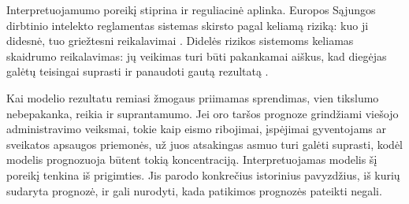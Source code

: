 \documentclass[]{VUMIFTemplateClass}
\begin{document}
    Interpretuojamumo poreikį stiprina ir reguliacinė aplinka.
    Europos Sąjungos dirbtinio intelekto reglamentas sistemas skirsto pagal keliamą riziką: kuo ji didesnė, tuo griežtesni reikalavimai \cite{reglamentas2024}.
    Didelės rizikos sistemoms keliamas skaidrumo reikalavimas: jų veikimas turi būti pakankamai aiškus, kad diegėjas galėtų teisingai suprasti ir panaudoti gautą rezultatą \cite{reglamentas2024}.

    Kai modelio rezultatu remiasi žmogaus priimamas sprendimas, vien tikslumo nebepakanka, reikia ir suprantamumo.
    Jei oro taršos prognoze grindžiami viešojo administravimo veiksmai, tokie kaip eismo ribojimai, įspėjimai gyventojams ar sveikatos apsaugos priemonės, už juos atsakingas asmuo turi galėti suprasti, kodėl modelis prognozuoja būtent tokią koncentraciją.
    Interpretuojamas modelis šį poreikį tenkina iš prigimties.
    Jis parodo konkrečius istorinius pavyzdžius, iš kurių sudaryta prognozė, ir gali nurodyti, kada patikimos prognozės pateikti negali.
%
%
\end{document}
